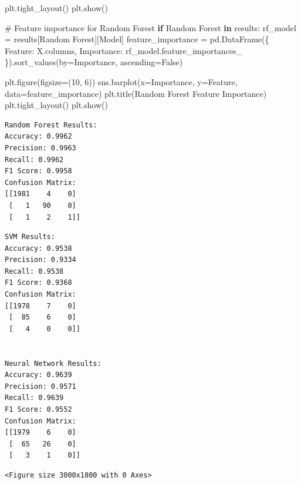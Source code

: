 \documentclass[
  12pt,
  letterpaper,
  DIV=11,
  numbers=noendperiod]{scrartcl}
\newenvironment{Shaded}{\begin{snugshade}}{\end{snugshade}}
\newcommand{\CommentTok}[1]{\textcolor[rgb]{0.37,0.37,0.37}{#1}}
\newcommand{\ControlFlowTok}[1]{\textcolor[rgb]{0.00,0.23,0.31}{\textbf{#1}}}
\newcommand{\DecValTok}[1]{\textcolor[rgb]{0.68,0.00,0.00}{#1}}
\newcommand{\KeywordTok}[1]{\textcolor[rgb]{0.00,0.23,0.31}{\textbf{#1}}}
\newcommand{\NormalTok}[1]{\textcolor[rgb]{0.00,0.23,0.31}{#1}}
\newcommand{\OperatorTok}[1]{\textcolor[rgb]{0.37,0.37,0.37}{#1}}
\newcommand{\StringTok}[1]{\textcolor[rgb]{0.13,0.47,0.30}{#1}}
\newcommand{\VariableTok}[1]{\textcolor[rgb]{0.07,0.07,0.07}{#1}}
\begin{document}
\begin{Shaded}
\begin{Highlighting}[]
\NormalTok{plt.tight\_layout()}
\NormalTok{plt.show()}

\CommentTok{\# Feature importance for Random Forest}
\ControlFlowTok{if} \StringTok{\textquotesingle{}Random Forest\textquotesingle{}} \KeywordTok{in}\NormalTok{ results:}
\NormalTok{    rf\_model }\OperatorTok{=}\NormalTok{ results[}\StringTok{\textquotesingle{}Random Forest\textquotesingle{}}\NormalTok{][}\StringTok{\textquotesingle{}Model\textquotesingle{}}\NormalTok{]}
\NormalTok{    feature\_importance }\OperatorTok{=}\NormalTok{ pd.DataFrame(\{}
        \StringTok{\textquotesingle{}Feature\textquotesingle{}}\NormalTok{: X.columns,}
        \StringTok{\textquotesingle{}Importance\textquotesingle{}}\NormalTok{: rf\_model.feature\_importances\_}
\NormalTok{    \}).sort\_values(by}\OperatorTok{=}\StringTok{\textquotesingle{}Importance\textquotesingle{}}\NormalTok{, ascending}\OperatorTok{=}\VariableTok{False}\NormalTok{)}
    
\NormalTok{    plt.figure(figsize}\OperatorTok{=}\NormalTok{(}\DecValTok{10}\NormalTok{, }\DecValTok{6}\NormalTok{))}
\NormalTok{    sns.barplot(x}\OperatorTok{=}\StringTok{\textquotesingle{}Importance\textquotesingle{}}\NormalTok{, y}\OperatorTok{=}\StringTok{\textquotesingle{}Feature\textquotesingle{}}\NormalTok{, data}\OperatorTok{=}\NormalTok{feature\_importance)}
\NormalTok{    plt.title(}\StringTok{\textquotesingle{}Random Forest Feature Importance\textquotesingle{}}\NormalTok{)}
\NormalTok{    plt.tight\_layout()}
\NormalTok{    plt.show()}
\end{Highlighting}
\end{Shaded}

\begin{verbatim}
Random Forest Results:
Accuracy: 0.9962
Precision: 0.9963
Recall: 0.9962
F1 Score: 0.9958
Confusion Matrix:
[[1981    4    0]
 [   1   90    0]
 [   1    2    1]]

\end{verbatim}

\begin{verbatim}
SVM Results:
Accuracy: 0.9538
Precision: 0.9334
Recall: 0.9538
F1 Score: 0.9368
Confusion Matrix:
[[1978    7    0]
 [  85    6    0]
 [   4    0    0]]


Neural Network Results:
Accuracy: 0.9639
Precision: 0.9571
Recall: 0.9639
F1 Score: 0.9552
Confusion Matrix:
[[1979    6    0]
 [  65   26    0]
 [   3    1    0]]

\end{verbatim}

\begin{verbatim}
<Figure size 3000x1800 with 0 Axes>
\end{verbatim}
\end{document}
